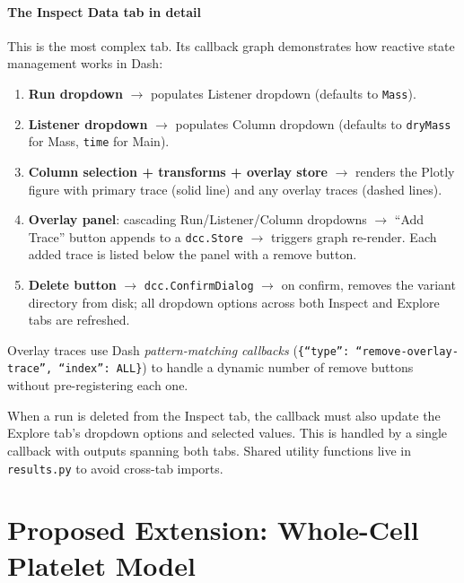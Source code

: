 \documentclass[11pt,a4paper]{article}
\begin{document}
\subsection{The Inspect Data tab in detail}

This is the most complex tab.  Its callback graph demonstrates how reactive
state management works in Dash:

\begin{enumerate}[nosep]
  \item \textbf{Run dropdown} $\to$ populates Listener dropdown (defaults to
    \texttt{Mass}).
  \item \textbf{Listener dropdown} $\to$ populates Column dropdown (defaults to
    \texttt{dryMass} for Mass, \texttt{time} for Main).
  \item \textbf{Column selection + transforms + overlay store} $\to$ renders the
    Plotly figure with primary trace (solid line) and any overlay traces (dashed
    lines).
  \item \textbf{Overlay panel}: cascading Run/Listener/Column dropdowns $\to$
    ``Add Trace'' button appends to a \texttt{dcc.Store} $\to$ triggers graph
    re-render.  Each added trace is listed below the panel with a remove button.
  \item \textbf{Delete button} $\to$ \texttt{dcc.ConfirmDialog} $\to$ on
    confirm, removes the variant directory from disk; all dropdown
    options across both Inspect and Explore tabs are refreshed.
\end{enumerate}

Overlay traces use Dash \emph{pattern-matching callbacks}
(\texttt{\{``type'': ``remove-overlay-trace'', ``index'': ALL\}}) to handle a
dynamic number of remove buttons without pre-registering each one.

When a run is deleted from the Inspect tab, the callback must also update the
Explore tab's dropdown options and selected values.  This is handled by a
single callback with outputs spanning both tabs.  Shared utility functions
live in \texttt{results.py} to avoid cross-tab imports.


\part{Proposed Extension: Whole-Cell Platelet Model}

\end{document}
